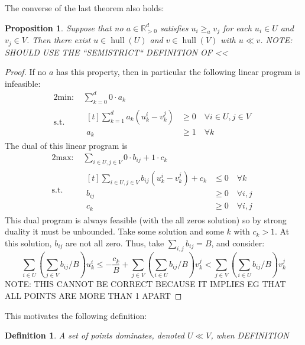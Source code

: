 \documentclass[12pt]{article}
\newtheorem*{definition}{Definition}
\newtheorem{proposition}[theorem]{Proposition}
\newcommand{\R}{\mathbb{R}}
\DeclareMathOperator*{\hull}{hull}
\newcommand{\1}[1]{\mathds{1}[{#1}]}
\begin{document}
    The converse of the last theorem also holds:
    \begin{proposition}
      Suppose that no $a\in \R_{>0}^d$ satisfies $u_i \ge_a v_j$ for each 
      $u_i \in U$ and $v_j\in V$.
      Then there exist $u\in\hull(U)$ and $v\in\hull(V)$ with $u\ll v$.
      NOTE: SHOULD USE THE ``SEMISTRICT`` DEFINITION OF << 
    \end{proposition}
    \begin{proof}
      If no $a$ has this property, then in particular the following linear
      program is infeasible:
      \begin{alignat*}{2}
        \text{min: } &
        \sum_{k=0}^d 0\cdot a_k \\
        \text{s.t. } &
        \begin{aligned}[t]
          \sum_{k=1}^d a_k (u^i_k - v^j_k)
            & \ge 0
            \quad \forall i\in U, j\in V
          \\ a_k & \ge 1 \quad \forall k
        \end{aligned}
      \end{alignat*}
      The dual of this linear program is
      \begin{alignat*}{2}
        \text{max: } &
          \sum_{i\in U, j\in V} 0\cdot b_{ij} + 1\cdot c_k \\
        \text{s.t. } &
        \begin{aligned}[t]
          \sum_{i\in U, j\in V} b_{ij}(u^i_k - v^j_k) + c_k
            & \le 0
            \quad \forall k
          \\ b_{ij} & \ge 0 \quad \forall i,j
          \\ c_k & \ge 0 \quad \forall i,j
        \end{aligned}
      \end{alignat*}
      This dual program is always feasible (with the all zeros solution)
      so by strong duality it must be unbounded.
      Take some solution and some $k$ with $c_k > 1$.
      At this solution, $b_{ij}$ are not all zero.
      Thus, take
      $\sum_{i,j} b_{ij}=B$, and consider:
      \[ \sum_{i\in U} \left(\sum_{j\in V}b_{ij}/B \right) u^i_k
        \le - \frac {c_k} B + \sum_{j\in V} \left(\sum_{i\in U}b_{ij}/B \right) v^j_k
        < \sum_{j\in V} \left(\sum_{i\in U}b_{ij} / B\right) v^j_k
      \]
      NOTE: THIS CANNOT BE CORRECT BECAUSE IT IMPLIES EG THAT ALL
      POINTS ARE MORE THAN 1 APART
    \end{proof}


    This motivates the following definition:
    \begin{definition}
      A set of points dominates, denoted $U \ll V$,
      when DEFINITION
    \end{definition}
\end{document}
